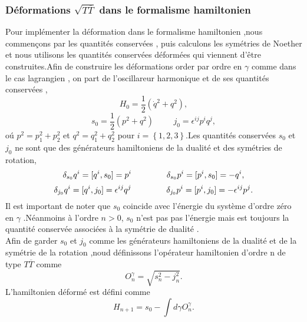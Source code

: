 \documentclass[12pt,a4paper, openany]{article}
\begin{document}
    \subsubsection{Déformations $\sqrt{T{\overline{T}}}$ dans le formalisme hamiltonien}
   \hspace{0.5cm}Pour implémenter la déformation dans le formalisme hamiltonien ,nous commençons par les quantités conservées , puis calculons les symétries de Noether et nous utilisons les quantités conservées déformées qui viennent d'\^{e}tre construites.Afin de construire les déformations order par ordre en $\gamma$ comme dans le cas lagrangien , on part de l'oscillareur harmonique et de ses quantités conservées ,
   \begin{equation}
   	H_0=\frac{1}{2}\left(\dot{q}^{2}+q^{2}\right),
   \end{equation}
    \begin{equation}
    	s_0=\frac{1}{2}\left({p}^{2}+q^{2}\right) \hspace{1cm} j_0=\epsilon^{ij}p^iq^j,
    \end{equation}
    o\'{u} $p^2=p^2_1+p^2_2$\hspace{0.5cm} et\hspace{0.5cm} $q^2=q^2_1+q^2_2 $ \hspace{0.5cm} pour\hspace{0.2cm}  $i=\left\{1,2,3\right\} $.Les quantités conservées $s_0$ et $j_0$ ne sont que des générateurs hamiltoniens de la dualité  et des symétries de rotation,
    \begin{equation}
    \delta_{s_0}q^i=[q^i,s_0]=p^i \hspace{1.5cm} \delta_{s_0}p^i=[p^i,s_0]=-q^i,   
    \end{equation}
    \begin{equation}
    \delta_{j_0}q^i=[q^i,j_0]=\epsilon^{ij}q^j \hspace{1.5cm}  \delta_{j_0}p^i=[p^i,j_0]=-\epsilon^{ij}p^j .
    \end{equation}
    \hspace{0.5cm}Il est important de noter que $s_0$ coincide avec l'énergie du système d'ordre zéro en $\gamma$ .Néanmoins à l'ordre $n>0$, $s_0$ n'est pas pas l'énergie mais est toujours la quantité conservée associées à la symétrie de dualité .\\
   
    \hspace{0.5cm}Afin de garder $s_0$ et $j_0$ comme les générateurs hamiltoniens de la dualité et de la symétrie de la rotation ,noud définissons l'opérateur hamiltonien d'ordre n de type $T{\overline{T}}$ comme 
    \begin{equation}
    O^{\gamma}_n=\sqrt{s^2_n-j^2_n} .	
    \end{equation}
    L'hamiltonien déformé est défini comme 
    \begin{equation}
    	H_{n+1}=s_0-\int d{\gamma}O^{\gamma}_n .
    \end{equation}
    
\end{document}
